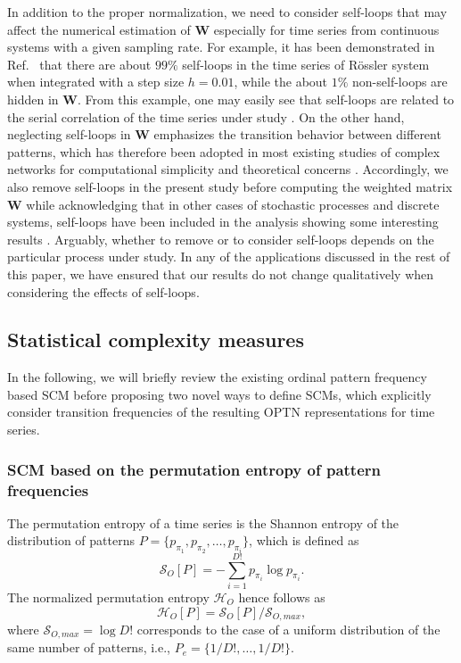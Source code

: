 \documentclass[12pt,aip,cha,reprint,nofootinbib]{revtex4-1}
\begin{document}
In addition to the proper normalization, we need to consider self-loops that may affect the numerical estimation of $\mathbf{W}$ especially for time series from continuous systems with a given sampling rate. For example, it has been demonstrated in Ref.~\cite{zhangSciRep2017} that there are about $99\%$ self-loops in the time series of R\"ossler system when integrated with a step size $h = 0.01$, while the about $1\%$ non-self-loops are hidden in $\mathbf{W}$. From this example, one may easily see that self-loops are related to the serial correlation of the time series under study \cite{BorgesAMC2019}. On the other hand, neglecting self-loops in $\mathbf{W}$ emphasizes the transition behavior between different patterns, which has therefore been adopted in most existing studies of complex networks for computational simplicity and theoretical concerns \cite{CostaADPhy2007}. Accordingly, we also remove self-loops in the present study before computing the weighted matrix $\mathbf{W}$ while acknowledging that in other cases of stochastic processes and discrete systems, self-loops have been included in the analysis showing some interesting results \cite{BorgesAMC2019}. Arguably, whether to remove or to consider self-loops depends on the particular process under study. In any of the applications discussed in the rest of this paper, we have ensured that our results do not change qualitatively when considering the effects of self-loops.

\subsection{Statistical complexity measures} \label{sec:SCM}

In the following, we will briefly review the existing ordinal pattern frequency based SCM before proposing two novel ways to define SCMs, which explicitly consider transition frequencies of the resulting OPTN representations for time series. 
 
\subsubsection{SCM based on the permutation entropy of pattern frequencies} 

The permutation entropy of a time series is the Shannon entropy of the distribution of patterns $P = \{p_{\pi_1}, p_{\pi_2},\ldots,p_{\pi_i} \}$, which is defined as
\begin{equation}
\mathcal{S}_{O}[P]= - \sum_{i=1}^{D!} p_{\pi_i} \log p_{\pi_i}. 
\end{equation}
The normalized permutation entropy $\mathcal{H}_O$ hence follows as 
\begin{equation} \label{eq:Ho}
\mathcal{H}_{O}[P] = \mathcal{S}_{O}[P] / \mathcal{S}_{O, max}, 
\end{equation}
where $\mathcal{S}_{O, max} = \log D!$ corresponds to the case of a uniform distribution of the same number of patterns, i.e., $P_e = \{1/D!, \ldots, 1/D!\}$. 
\end{document}
